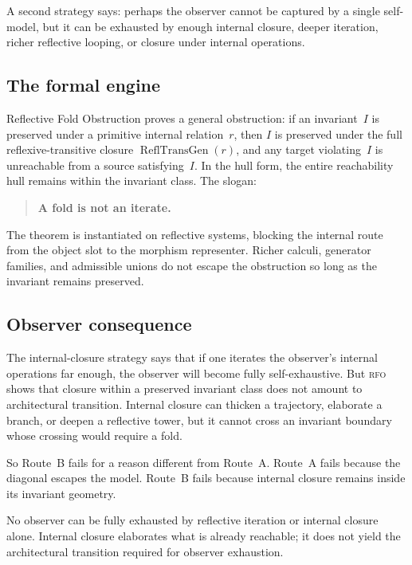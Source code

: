 \documentclass[11pt]{article}
\theoremstyle{plain}
\theoremstyle{definition}
\theoremstyle{remark}
\newcommand{\RFO}{\textsc{rfo}}
\newcommand{\ReflTransGen}{\operatorname{ReflTransGen}}
\begin{document}
A second strategy says: perhaps the observer cannot be captured by a
single self-model, but it can be exhausted by enough internal closure,
deeper iteration, richer reflective looping, or closure under internal
operations.

\subsection*{The formal engine}

Reflective Fold Obstruction proves a general obstruction: if an
invariant~$I$ is preserved under a primitive internal relation~$r$, then
$I$ is preserved under the full reflexive-transitive closure
$\ReflTransGen(r)$, and any target violating~$I$ is unreachable from a
source satisfying~$I$.  In the hull form, the entire reachability hull
remains within the invariant class.  The slogan:
\begin{quote}
\textbf{A fold is not an iterate.}
\end{quote}
The theorem is instantiated on reflective systems, blocking the internal
route from the object slot to the morphism representer.  Richer calculi,
generator families, and admissible unions do not escape the obstruction so
long as the invariant remains preserved.

\subsection*{Observer consequence}

The internal-closure strategy says that if one iterates the observer's
internal operations far enough, the observer will become fully
self-exhaustive.  But \RFO{} shows that closure within a preserved
invariant class does not amount to architectural transition.  Internal
closure can thicken a trajectory, elaborate a branch, or deepen a
reflective tower, but it cannot cross an invariant boundary whose crossing
would require a fold.

So Route~B fails for a reason different from Route~A.  Route~A fails
because the diagonal escapes the model.  Route~B fails because internal
closure remains inside its invariant geometry.

\begin{keybox}[title={Route B is blocked}]
No observer can be fully exhausted by reflective iteration or internal
closure alone.  Internal closure elaborates what is already reachable; it
does not yield the architectural transition required for observer
exhaustion.
\end{keybox}
\end{document}
